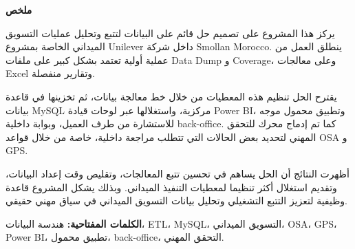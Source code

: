 \documentclass[12pt,a4paper]{article}
\begin{document}
\vspace*{1.2cm}

\begin{center}
\begin{minipage}{0.78\textwidth}
\raggedleft
{\Large\bfseries ملخص}
\end{minipage}
\end{center}

\vspace{0.9cm}

\begin{center}
\begin{minipage}{0.78\textwidth}
\setlength{\parindent}{0pt}
\setlength{\parskip}{6pt}

يركز هذا المشروع على تصميم حل قائم على البيانات لتتبع وتحليل عمليات التسويق الميداني الخاصة بمشروع \textenglish{Unilever} داخل شركة \textenglish{Smollan Morocco}. ينطلق العمل من عملية أولية تعتمد بشكل كبير على ملفات \textenglish{Data Dump} و \textenglish{Coverage}، وعلى معالجات \textenglish{Excel} وتقارير منفصلة.

يقترح الحل تنظيم هذه المعطيات من خلال خط معالجة بيانات، ثم تخزينها في قاعدة بيانات \textenglish{MySQL} مركزية، واستغلالها عبر لوحات قيادة \textenglish{Power BI}، وتطبيق محمول موجه للاستشارة من طرف العميل، وبوابة داخلية \textenglish{back-office}. كما تم إدماج محرك للتحقق المهني لتحديد بعض الحالات التي تتطلب مراجعة داخلية، خاصة من خلال قواعد \textenglish{OSA} و \textenglish{GPS}.

أظهرت النتائج أن الحل يساهم في تحسين تتبع المعالجات، وتقليص وقت إعداد البيانات، وتقديم استغلال أكثر تنظيما لمعطيات التنفيذ الميداني. وبذلك يشكل المشروع قاعدة وظيفية لتعزيز التتبع التشغيلي وتحليل بيانات التسويق الميداني في سياق مهني حقيقي.

\vspace{0.8cm}

\textbf{الكلمات المفتاحية:} هندسة البيانات، \textenglish{ETL}، \textenglish{MySQL}، التسويق الميداني، \textenglish{OSA}، \textenglish{GPS}، \textenglish{Power BI}، تطبيق محمول، \textenglish{back-office}، التحقق المهني.

\end{minipage}
\end{center}
\end{document}
